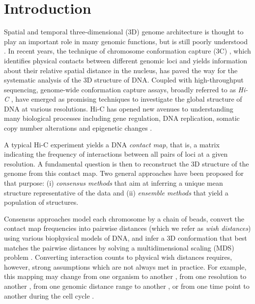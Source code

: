 \section{Introduction}

Spatial and temporal three-dimensional (3D) genome architecture is
thought to play an important role in many genomic functions, but is
still poorly understood \citep{vansteensel:genomics}. In recent years, the
technique of chromosome conformation capture (3C)
\citep{dekker:capturing}, which identifies physical contacts between
different genomic loci and yields information about their relative
spatial distance in the nucleus, has paved the way for the systematic
analysis of the 3D structure of DNA. Coupled with high-throughput
sequencing, genome-wide conformation capture assays, broadly referred
to as {\em Hi-C} \citep{lieberman-aiden:comprehensive}, have emerged
as promising techniques to investigate the global structure of DNA at
various resolutions. Hi-C has opened new avenues to understanding many
biological processes including gene regulation, DNA replication,
somatic copy number alterations and epigenetic changes
\citep{shen:map,ryba:evolutionarily, de:DNA, dixon:topological}.

A typical Hi-C experiment yields a DNA {\em contact map}, that is, a
matrix indicating the frequency of interactions between all pairs of
loci at a given resolution.  A fundamental question is then to
reconstruct the 3D structure of the genome from this contact map. Two
general approaches have been proposed for that purpose: (i)
\emph{consensus methods} that aim at inferring a unique mean structure
representative of the data and (ii) \emph{ensemble methods} that
yield a population of structures.

Consensus approaches \citep{duan:three,
  tanizawa:mapping, bau:three-dimensional} model each
chromosome by a chain of beads, convert the contact map frequencies
into pairwise distances (which we refer as \emph{wish
  distances}) using various biophysical models of DNA, and infer a 3D
conformation that best matches the pairwise distances by solving a
multidimensional scaling (MDS) problem
\citep{kruskal:multidimensional2}. Converting interaction counts to
physical wish distances requires, however, strong assumptions which
are not always met in practice. For example, this mapping may change
from one organism to another \citep{fudenberg:higher-order}, from one
resolution to another \citep{zhang:inference}, from one genomic distance 
range to another \citep{ay:statistical}, or from one time point to 
another during the cell cycle \citep{le:high-resolution, ay:three-dimensional}.

